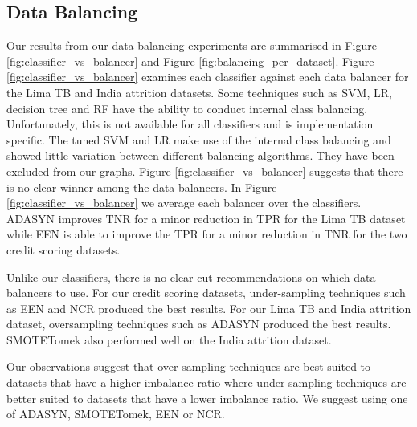 \documentclass{sig-alternate-05-2015}
\begin{document}
	\subsection{Data Balancing}
	Our results from our data balancing experiments are summarised in Figure \ref{fig:classifier_vs_balancer} and Figure \ref{fig:balancing_per_dataset}. Figure \ref{fig:classifier_vs_balancer} examines each classifier against each data balancer for the Lima TB and India attrition datasets. Some techniques such as SVM, LR, decision tree and RF have the ability to conduct internal class balancing. Unfortunately, this is not available for all classifiers and is implementation specific. The tuned SVM and LR make use of the internal class balancing and showed little variation between different balancing algorithms. They have been excluded from our graphs. Figure \ref{fig:classifier_vs_balancer} suggests that there is no clear winner among the data balancers. In Figure \ref{fig:classifier_vs_balancer} we average each balancer over the classifiers. ADASYN improves TNR for a minor reduction in TPR for the Lima TB dataset while EEN is able to improve the TPR for a minor reduction in TNR for the two credit scoring datasets.
	
	Unlike our classifiers, there is no clear-cut recommendations on which data balancers to use. For our credit scoring datasets, under-sampling techniques such as EEN and NCR produced the best results. For our Lima TB and India attrition dataset, oversampling techniques such as ADASYN produced the best results. SMOTETomek also performed well on the India attrition dataset.
	
	Our observations suggest that over-sampling techniques are best suited to datasets that have a higher imbalance ratio where under-sampling techniques are better suited to datasets that have a lower imbalance ratio. We suggest using one of ADASYN, SMOTETomek, EEN or NCR.
	
\end{document}
